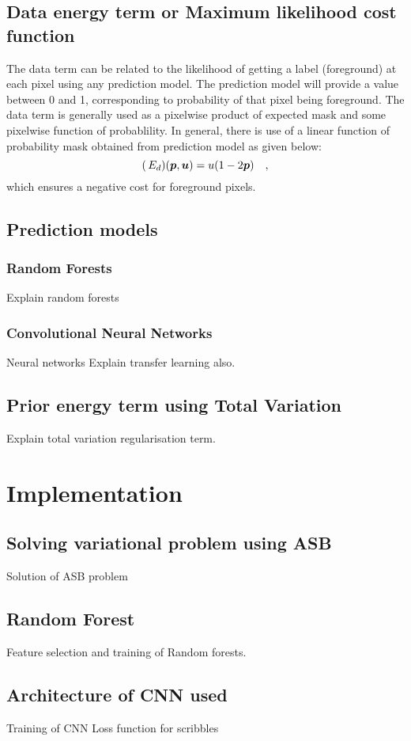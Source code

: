 \section{Data energy term or Maximum likelihood cost function}
The data term can be related to the likelihood of getting a label (foreground) at each pixel using any prediction model. The prediction model will provide a value between 0 and 1, corresponding to probability of that pixel being foreground. The data term is generally used as a pixelwise product of expected mask and some pixelwise function of probablility. In general, there is use of a linear function of probability mask obtained from prediction model as given below:
\begin{equation*}
\mathop{{}(}E_d)(\boldsymbol{p}, \boldsymbol{u}) = u(1-2\boldsymbol{p}) \quad ,
\end{equation*}
which ensures a negative cost for foreground pixels. 

\section{Prediction models}
\subsection{Random Forests}
Explain random forests
\subsection{Convolutional Neural Networks}
Neural networks \newline
Explain transfer learning also.

\section{Prior energy term using Total Variation}
Explain total variation regularisation term.


\chapter{Implementation}
\section{Solving variational problem using ASB}
Solution of ASB problem
\section{Random Forest}
Feature selection and training of Random forests.
\section{Architecture of CNN used}
Training of CNN \newline
Loss function for scribbles
